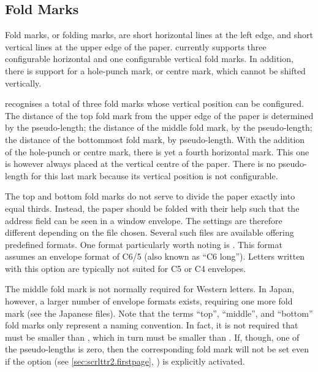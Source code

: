 \subsection{Fold Marks}
\BeginIndexGroup
{}%

Fold marks, or folding marks, are short horizontal lines at the left edge, and
short vertical lines at the upper edge of the paper. \KOMAScript{} currently
supports three configurable horizontal and one configurable vertical fold
marks. In addition, there is support for a hole-punch mark, or centre mark,
which cannot be shifted vertically.

\begin{Declaration}
\end{Declaration}
\KOMAScript{} recognises a total of three fold marks whose vertical position
can be configured. The distance of the top fold mark from the upper edge of
the paper is determined by the  pseudo-length; the
distance of the middle fold mark, by the
 pseudo-length; the
distance of the bottommost fold mark, by 
pseudo-length. With the addition of the hole-punch or
centre mark, there is yet a fourth
horizontal mark. This one is however always placed at the vertical centre of
the paper.
\iftrue%
There is no pseudo-length for this last mark because its vertical position is
not configurable.
\fi

The top and bottom fold marks do not serve to divide the
paper exactly into equal thirds. Instead, the paper should be folded with
their help such that the address field can be seen in a window envelope. The
settings are therefore different depending on the  file chosen.
Several such files are available offering predefined formats. One format
particularly worth noting is . This format assumes an
envelope format of C6/5 (also known as ``C6 long''). Letters written with this
option are typically not suited for C5 or C4 envelopes.

The middle fold mark is not normally required for Western letters. In Japan,
however, a larger number of envelope formats exists, requiring one more fold
mark (see the Japanese  files). Note that the terms ``top'',
``middle'', and ``bottom'' fold marks only represent a naming convention. In
fact, it is not required that  must be smaller than
, which in turn must be smaller than
. If, though, one of the pseudo-lengths is zero, then
the corresponding fold mark will not be set even if the
%
 option (see
\autoref{sec:scrlttr2.firstpage}, ) is
explicitly activated.
%
\EndIndexGroup


